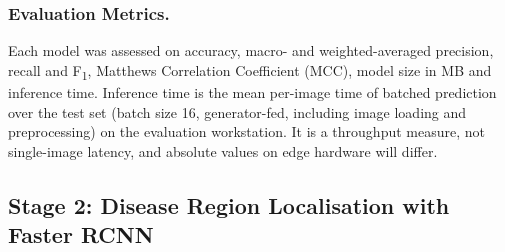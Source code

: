 \subsubsection{Evaluation Metrics.}
\label{sec:metrics}
Each model was assessed on accuracy, macro- and weighted-averaged
precision, recall and F\textsubscript{1}, Matthews Correlation
Coefficient (MCC), model size in MB and inference time. Inference time is
the mean per-image time of batched prediction over the test set (batch
size 16, generator-fed, including image loading and preprocessing) on the
evaluation workstation. It is a throughput measure, not single-image
latency, and absolute values on edge hardware will differ.

\subsection{Stage 2: Disease Region Localisation with Faster RCNN}
\label{sec:detection}

